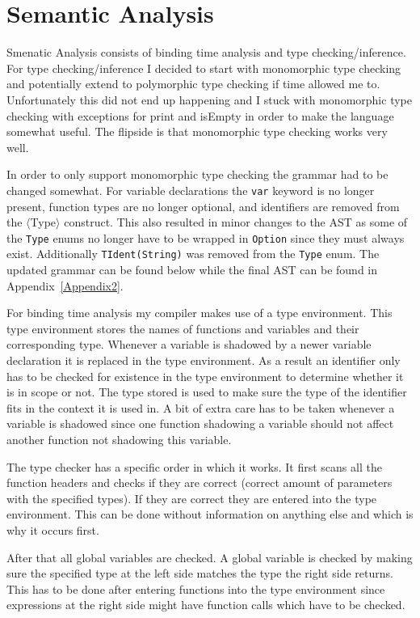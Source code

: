 \documentclass{article}
\begin{document}
\section{Semantic Analysis}
Smenatic Analysis consists of binding time analysis and type checking/inference. For type checking/inference I decided to start with monomorphic type checking and potentially extend to polymorphic type checking if time allowed me to. Unfortunately this did not end up happening and I stuck with monomorphic type checking with exceptions for print and isEmpty in order to make the language somewhat useful. The flipside is that monomorphic type checking works very well.

In order to only support monomorphic type checking the grammar had to be changed somewhat. For variable declarations the \texttt{var} keyword is no longer present, function types are no longer optional, and identifiers are removed from the $\langle$Type$\rangle$ construct. This also resulted in minor changes to the AST as some of the \texttt{Type} enums no longer have to be wrapped in \texttt{Option} since they must always exist. Additionally \texttt{TIdent(String)} was removed from the \texttt{Type} enum. The updated grammar can be found below while the final AST can be found in Appendix~\ref{Appendix2}.

For binding time analysis my compiler makes use of a type environment. This type environment stores the names of functions and variables and their corresponding type. Whenever a variable is shadowed by a newer variable declaration it is replaced in the type environment. As a result an identifier only has to be checked for existence in the type environment to determine whether it is in scope or not. The type stored is used to make sure the type of the identifier fits in the context it is used in. A bit of extra care has to be taken whenever a variable is shadowed since one function shadowing a variable should not affect another function not shadowing this variable.

The type checker has a specific order in which it works. It first scans all the function headers and checks if they are correct (correct amount of parameters with the specified types). If they are correct they are entered into the type environment. This can be done without information on anything else and which is why it occurs first.

After that all global variables are checked. A global variable is checked by making sure the specified type at the left side matches the type the right side returns. This has to be done after entering functions into the type environment since expressions at the right side might have function calls which have to be checked.
\end{document}
